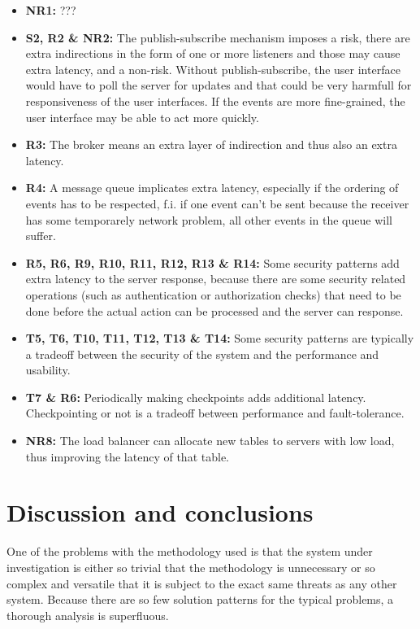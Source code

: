 \documentclass[a4paper,11pt]{report}
\begin{document}
\begin{itemize}
\item \textbf{NR1:} ???
\item \textbf{S2, R2 \& NR2:} The publish-subscribe mechanism imposes a risk, there are extra indirections in the
form of one or more listeners and those may cause extra latency, and a non-risk. Without publish-subscribe, the user
interface would have to poll the server for updates and that could be very harmfull for responsiveness of the
user interfaces. If the events are more fine-grained, the user interface may be able to act more quickly.
\item \textbf{R3:} The broker means an extra layer of indirection and thus also an extra latency.
\item \textbf{R4:} A message queue implicates extra latency, especially if the ordering of events has to
be respected, f.i. if one event can't be sent because the receiver has some temporarely network problem, all other
events in the queue will suffer.
\item \textbf{R5, R6, R9, R10, R11, R12, R13 \& R14:} Some security patterns add extra latency to the server response, because there are some security
related operations (such as authentication or authorization checks) that need to be done before the actual action
can be processed and the server can response.
\item \textbf{T5, T6, T10, T11, T12, T13 \& T14:} Some security patterns are typically a tradeoff between the security of the system and the
performance and usability.
\item \textbf{T7 \& R6:} Periodically making checkpoints adds additional latency. Checkpointing or not is a tradeoff
between performance and fault-tolerance.
\item \textbf{NR8:} The load balancer can allocate new tables to servers with low load, thus improving
the latency of that table.
\end{itemize}
\chapter{Discussion and conclusions}

One of the problems with the methodology used is that the system under investigation is either so trivial that the methodology is unnecessary or so complex and versatile that it is subject to the exact same threats as any other system. Because there are so few solution patterns for the typical problems, a thorough analysis is superfluous.
\end{document}
